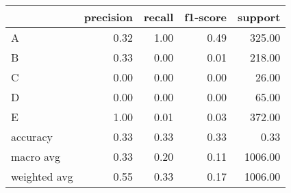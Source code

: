 \begin{tabular}{|l|r|r|r|r|}
\hline
{} &  precision &  recall &  f1-score &  support \\
\hline
A            &       0.32 &    1.00 &      0.49 &   325.00 \\
B            &       0.33 &    0.00 &      0.01 &   218.00 \\
C            &       0.00 &    0.00 &      0.00 &    26.00 \\
D            &       0.00 &    0.00 &      0.00 &    65.00 \\
E            &       1.00 &    0.01 &      0.03 &   372.00 \\
accuracy     &       0.33 &    0.33 &      0.33 &     0.33 \\
macro avg    &       0.33 &    0.20 &      0.11 &  1006.00 \\
weighted avg &       0.55 &    0.33 &      0.17 &  1006.00 \\
\hline
\end{tabular}
